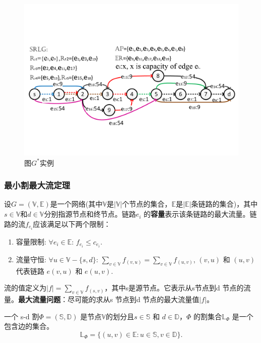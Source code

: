 \begin{figure}[tp]
  \centering
  \includegraphics[width=4.5in]{figures/FlowStarGraph}
  \caption{图$G^*$实例}\label{fig:FlowStarGraph}
\end{figure}



\subsubsection{最小割最大流定理}
\label{subsubsec:maxFlow}
设$G=(\mathbb{\mathbb{V}},\mathbb{\mathbb{E}})$是一个网络(其中$\mathbb{\mathbb{V}}$是$|\mathbb{\mathbb{V}}|$个节点的集合，$\mathbb{\mathbb{E}}$是$|\mathbb{\mathbb{E}}|$条链路的集合)，其中$s\in \mathbb{V}$和$d\in \mathbb{V}$分别指源节点和终节点。链路$e_i$ 的\textbf{容量}表示该条链路的最大流量。链路的流$f_{e_i}$应该满足以下两个限制：
\begin{enumerate}
  \item 容量限制: $\forall e_i\in \mathbb{\mathbb{E}}$: $f_{e_i}\leq c_{e_i}$.
  \item 流量守恒: $\forall u\in \mathbb{\mathbb{V}}-\{s,d\}$: $\sum\limits_{v\in \mathbb{V}}f_{(v,u)}=\sum\limits_{v\in \mathbb{V}}f_{(u,v)}$,  $(v,u)$ 和 $(u,v)$ 代表链路 $e(v,u)$ 和 $e(u,v)$.
\end{enumerate}

流的值定义为$|f|=\sum\limits_{v\in \mathbb{V}}f_{(s,v)}$，其中s是源节点。它表示从s节点到d 节点的流量。\textbf{最大流量问题}：尽可能的求从s 节点到d 节点的最大流量值$|f|$。

一个 s-d 割${\Phi}=(\mathbb{S},\mathbb{D})$ 是节点$\mathbb{V}$的划分且$s \in \mathbb{S}$ 和 $d \in \mathbb{D}$，$\Phi$ 的割集合$\mathbb{\mathbb{L}}_{\Phi}$ 是一个包含边的集合。
\begin{equation}
\mathbb{\mathbb{L}}_{\Phi}=\{(u,v)\in \mathbb{E}: u \in \mathbb{S}, v \in \mathbb{D}\}.
\end{equation}

